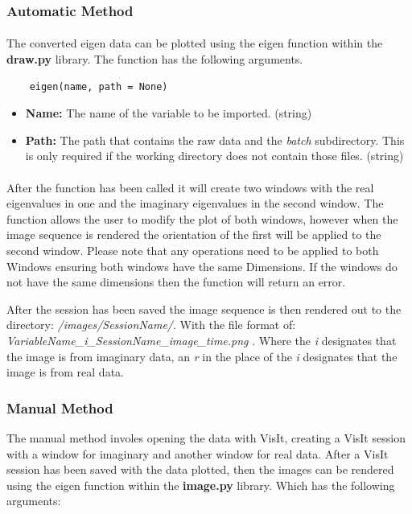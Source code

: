 \documentclass[12pt,a4paper]{article}
\begin{document}
	\subsubsection{Automatic Method}
	\paragraph{}
	The converted eigen data can be plotted using the eigen function within the \textbf{draw.py} library. The function has the following arguments.
	
	\begin{verbatim}
	eigen(name, path = None)
	\end{verbatim}
	
	\begin{itemize}
		\item{\textbf{Name:} The name of the variable to be imported. (string)}
		\item{\textbf{Path:} The path that contains the raw data and the \textit{batch} subdirectory. This is only required if the working directory does not contain those files. (string)}
	\end{itemize}
	
	
	\paragraph{}
	After the function has been called it will create two windows with the real eigenvalues in one and the imaginary eigenvalues in the second window. The function allows the user to modify the plot of both windows, however when the image sequence is rendered the orientation of the first will be applied to the second window. Please note that any operations need to be applied to both Windows ensuring both windows have the same Dimensions. If the windows do not have the same dimensions then the function will return an error.

	After the session has been saved the image sequence is then rendered out to the directory: \textit{/images/SessionName/}. With the file format of: \textit{VariableName\_i\_SessionName\_image\_time.png} . Where the \textit{i} designates that the image is from imaginary data, an \textit{r} in the place of the \textit{i} designates that the image is from real data.


	\subsubsection{Manual Method}
	The manual method involes opening the data with VisIt, creating a VisIt session with a window for imaginary and another window for real data. After a VisIt session has been saved with the data plotted, then the images can be rendered using the eigen function within the \textbf{image.py} library. Which has the following arguments:
	
\end{document}
